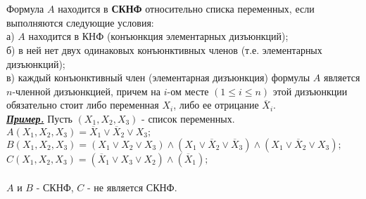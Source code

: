 \documentclass{article}
\begin{document}
	\\\\
	Формула $A$ находится в \textbf{СКНФ} относительно списка переменных, если выполняются
	следующие условия:\\
	а) $A$ находится в КНФ (конъюнкция элементарных дизъюнкций);\\
	б) в ней нет двух одинаковых конъюнктивных членов (т.е. элементарных
	дизъюнкций);\\
	в) каждый конъюнктивный член (элементарная дизъюнкция) формулы
	$A$ является $n$-членной дизъюнкцией, причем на $i$-ом месте
	$(1 \leq i \leq n)$ этой дизъюнкции обязательно стоит либо
	переменная $X_i$, либо ее отрицание $\overline{X}_i$.\\
	\underline{\textit{\textbf{Пример.}}} Пусть $(X_1, X_2, X_3)$ - список переменных.\\
	$A (X_1, X_2, X_3) = \overline{X}_1 \vee \overline{X}_2 \vee X_3;$\\
	$B (X_1, X_2, X_3) = (X_1 \vee X_2 \vee X_3) \wedge (X_1 \vee \overline{X}_2 \vee \overline{X}_3) \wedge (X_1 \vee \overline{X}_2 \vee X_3);$\\
	$C (X_1, X_2, X_3) = (\overline{X}_1 \vee X_3 \vee X_2) \wedge (\overline{X}_1);$
	\\\\
	$A$ и $B$ - СКНФ, $C$ - не является СКНФ.
	
\end{document}
